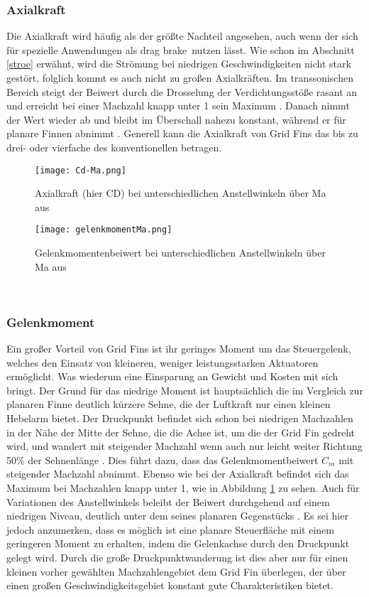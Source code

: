 \subsubsection{Axialkraft}
Die Axialkraft wird häufig als der größte Nachteil angesehen, auch wenn der sich für spezielle Anwendungen als \grqq drag brake\grqq \ nutzen lässt. Wie schon im Abschnitt \ref{stroe} erwähnt, wird die Strömung bei niedrigen Geschwindigkeiten nicht stark gestört, folglich kommt es auch nicht zu großen Axialkräften. Im transsonischen Bereich steigt der Beiwert durch die Drosselung der Verdichtungsstöße rasant an und erreicht bei einer Machzahl knapp unter 1 sein Maximum \cite{solver}. Danach nimmt der Wert wieder ab und bleibt im Überschall nahezu konstant, während er für planare Finnen abnimmt \cite{vergleichPlanarNATO}. Generell kann die Axialkraft von Grid Fins das bis zu drei- oder  vierfache des konventionellen betragen.
\begin{figure}[h]
	\begin{minipage}[t]{0.45\linewidth}
		\centering
		\texttt{[image: Cd-Ma.png]}
		\caption{Axialkraft (hier CD) bei unterschiedlichen Anstellwinkeln über Ma aus \cite{solver}}
	\end{minipage}
	\hfill
	\begin{minipage}[t]{0.45\linewidth}
		\centering
		\texttt{[image: gelenkmomentMa.png]}
		\caption{Gelenkmomentenbeiwert bei unterschiedlichen Anstellwinkeln über Ma aus \cite{solver}}
		\label{abb_Mm-Ma}
	\end{minipage}
\end{figure}\\
\subsubsection{Gelenkmoment}
Ein großer Vorteil von Grid Fins ist ihr geringes Moment um das Steuergelenk, welches den Einsatz von kleineren, weniger leistungsstarken Aktuatoren ermöglicht. Was wiederum eine Einsparung an Gewicht und Kosten mit sich bringt. Der Grund für das niedrige Moment ist hauptsächlich die im Vergleich zur planaren Finne deutlich kürzere Sehne, die der Luftkraft nur einen kleinen Hebelarm bietet. Der Druckpunkt befindet sich schon bei niedrigen Machzahlen in der Nähe der Mitte der Sehne, die die Achse ist, um die der Grid Fin gedreht wird, und wandert mit steigender Machzahl wenn auch nur leicht weiter Richtung 50\% der Sehnenlänge \cite{vergleichPlanarNATO}. Dies führt dazu, dass das Gelenkmomentbeiwert $C_m$ mit steigender Machzahl abnimmt. Ebenso wie bei der Axialkraft befindet sich das Maximum bei Machzahlen knapp unter 1, wie in Abbildung \ref{abb_Mm-Ma} zu sehen. Auch für Variationen des Anstellwinkels beleibt der Beiwert durchgehend auf einem niedrigen Niveau, deutlich unter dem seines planaren Gegenstücks \cite{vergleichPlanarNATO}. Es sei hier jedoch anzumerken, dass es möglich ist eine planare Steuerfläche mit einem geringeren Moment zu erhalten, indem die Gelenkachse durch den Druckpunkt gelegt wird. Durch die große Druckpunktwanderung ist dies aber nur für einen kleinen vorher gewählten Machzahlengebiet dem Grid Fin überlegen, der über einen großen Geschwindigkeitsgebiet konstant gute Charakteristiken bietet.
